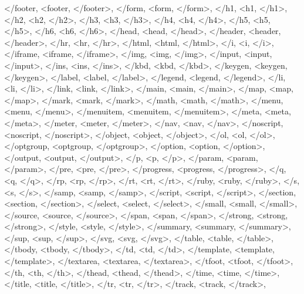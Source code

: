{{            </footer, <footer, </footer>,
            </form, <form, </form>,
            </h1, <h1, </h1>,
            </h2, <h2, </h2>,
            </h3, <h3, </h3>,
            </h4, <h4, </h4>,
            </h5, <h5, </h5>,
            </h6, <h6, </h6>,
            </head, <head, </head>,
            </header, <header, </header>,
            </hr, <hr, </hr>,
            </html, <html, </html>,
            </i, <i, </i>,
            </iframe, <iframe, </iframe>,
            </img, <img, </img>,
            </input, <input, </input>,
            </ins, <ins, </ins>,
            </kbd, <kbd, </kbd>,
            </keygen, <keygen, </keygen>,
            </label, <label, </label>,
            </legend, <legend, </legend>,
            </li, <li, </li>,
            </link, <link, </link>,
            </main, <main, </main>,
            </map, <map, </map>,
            </mark, <mark, </mark>,
            </math, <math, </math>,
            </menu, <menu, </menu>,
            </menuitem, <menuitem, </menuitem>,
            </meta, <meta, </meta>,
            </meter, <meter, </meter>,
            </nav, <nav, </nav>,
            </noscript, <noscript, </noscript>,
            </object, <object, </object>,
            </ol, <ol, </ol>,
            </optgroup, <optgroup, </optgroup>,
            </option, <option, </option>,
            </output, <output, </output>,
            </p, <p, </p>,
            </param, <param, </param>,
            </pre, <pre, </pre>,
            </progress, <progress, </progress>,
            </q, <q, </q>,
            </rp, <rp, </rp>,
            </rt, <rt, </rt>,
            </ruby, <ruby, </ruby>,
            </s, <s, </s>,
            </samp, <samp, </samp>,
            </script, <script, </script>,
            </section, <section, </section>,
            </select, <select, </select>,
            </small, <small, </small>,
            </source, <source, </source>,
            </span, <span, </span>,
            </strong, <strong, </strong>,
            </style, <style, </style>,
            </summary, <summary, </summary>,
            </sup, <sup, </sup>,
            </svg, <svg, </svg>,
            </table, <table, </table>,
            </tbody, <tbody, </tbody>,
            </td, <td, </td>,
            </template, <template, </template>,
            </textarea, <textarea, </textarea>,
            </tfoot, <tfoot, </tfoot>,
            </th, <th, </th>,
            </thead, <thead, </thead>,
            </time, <time, </time>,
            </title, <title, </title>,
            </tr, <tr, </tr>,
            </track, <track, </track>,
}}
